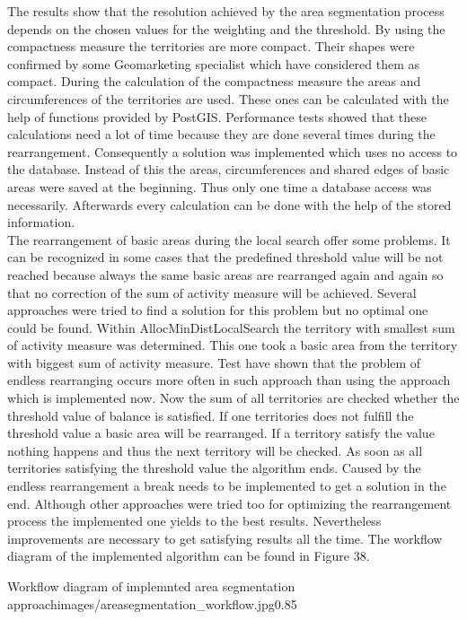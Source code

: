 The results show that the resolution achieved by the area segmentation process depends on the chosen values for the weighting and the threshold. By using the compactness measure the territories are more compact. Their shapes were confirmed by some Geomarketing specialist which have considered them as compact. During the calculation of the compactness measure the areas and circumferences of the territories are used. These ones can be calculated with the help of functions provided by PostGIS. Performance tests showed that these calculations need a lot of time because they are done several times during the rearrangement. Consequently a solution was implemented which uses no access to the database. Instead of this the areas, circumferences and shared edges of basic areas were saved at the beginning. Thus only one time a database access was necessarily. Afterwards every calculation can be done with the help of the stored information. \\
The rearrangement of basic areas during the local search offer some problems. It can be recognized in some cases that the predefined threshold value will be not reached because always the same basic areas are rearranged again and again so that no correction of the sum of activity measure will be achieved. Several approaches were tried to find a solution for this problem but no optimal one could be found. Within AllocMinDistLocalSearch the territory with smallest sum of activity measure was determined. This one took a basic area from the territory with biggest sum of activity measure. Test have shown that the problem of endless rearranging occurs more often in such approach than using the approach which is implemented now. Now the sum of all territories are checked whether the threshold value of balance is satisfied. If one territories does not fulfill the threshold value a basic area will be rearranged. If a territory satisfy the value nothing happens and thus the next territory will be checked. As soon as all territories satisfying the threshold value the algorithm ends. Caused by the endless rearrangement a break needs to be implemented to get a solution in the end. Although other approaches were tried too for optimizing the rearrangement process the implemented one yields to the best results. Nevertheless improvements are necessary to get satisfying results all the time. The workflow diagram of the implemented algorithm can be found in Figure 38. 

\begin{figurevarSize}{Workflow diagram of implemnted area segmentation approach}{images/areasegmentation_workflow.jpg}{0.85}\end{figurevarSize}

